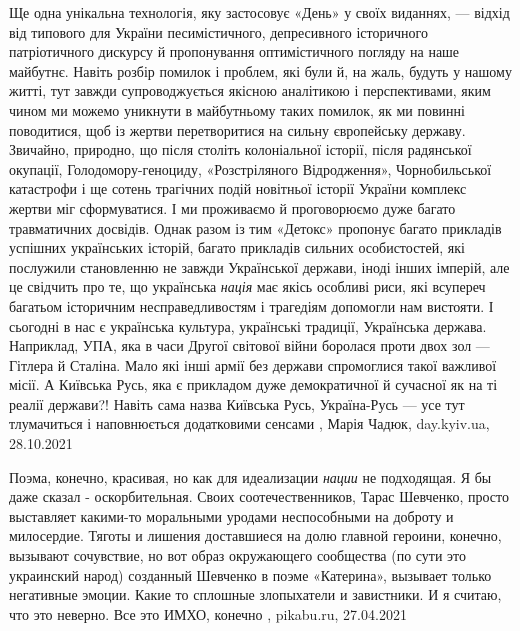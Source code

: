 Ще одна унікальна технологія, яку застосовує «День» у своїх виданнях, — відхід
від типового для України песимістичного, депресивного історичного патріотичного
дискурсу й пропонування оптимістичного погляду на наше майбутнє. Навіть розбір
помилок і проблем, які були й, на жаль, будуть у нашому житті, тут завжди
супроводжується якісною аналітикою і перспективами, яким чином ми можемо
уникнути в майбутньому таких помилок, як ми повинні поводитися, щоб із жертви
перетворитися на сильну європейську державу. Звичайно, природно, що після
століть колоніальної історії, після радянської окупації, Голодомору-геноциду,
«Розстріляного Відродження», Чорнобильської катастрофи і ще сотень трагічних
подій новітньої історії України комплекс жертви міг сформуватися. І ми
проживаємо й проговорюємо дуже багато травматичних досвідів.  Однак разом із
тим «Детокс» пропонує багато прикладів успішних українських історій, багато
прикладів сильних особистостей, які послужили становленню не завжди Української
держави, іноді інших імперій, але це свідчить про те, що українська
\emph{нація} має якісь особливі риси, які всупереч багатьом історичним
несправедливостям і трагедіям допомогли нам вистояти. І сьогодні в нас є
українська культура, українські традиції, Українська держава. Наприклад, УПА,
яка в часи Другої світової війни боролася проти двох зол — Гітлера й Сталіна.
Мало які інші армії без держави спромоглися такої важливої місії. А Київська
Русь, яка є прикладом дуже демократичної й сучасної як на ті реалії держави?!
Навіть сама назва Київська Русь, Україна-Русь — усе тут тлумачиться і
наповнюється додатковими сенсами
, 
Марія Чадюк, day.kyiv.ua, 28.10.2021

Поэма, конечно, красивая, но как для идеализации \emph{нации} не подходящая. Я
бы даже сказал - оскорбительная. Своих соотечественников, Тарас Шевченко,
просто выставляет какими-то моральными уродами неспособными на доброту и
милосердие.  Тяготы и лишения доставшиеся на долю главной героини, конечно,
вызывают сочувствие, но вот образ окружающего сообщества (по сути это
украинский народ) созданный Шевченко в поэме «Катерина», вызывает только
негативные эмоции. Какие то сплошные злопыхатели и завистники. И я считаю, что
это неверно.  Все это ИМХО, конечно
, pikabu.ru, 27.04.2021
